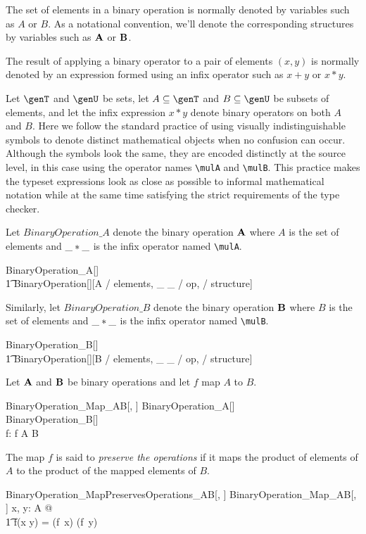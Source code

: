 \documentclass{amsart}
\begin{document}
The set of elements in a binary operation is normally denoted by variables such as $A$ or $B$.
As a notational convention, we'll denote the corresponding structures by variables such as $\mathbf{A}$ or $\mathbf{B}$.

The result of applying a binary operator to a pair of elements $(x, y)$ 
is normally denoted by an expression formed using an infix operator such as $x + y$ or $x * y$.

Let $\genT$ and $\genU$ be sets, 
let $A \subseteq \genT$ and $B \subseteq \genU$ be subsets of elements,
and let the infix expression $x * y$ denote binary operators on both $A$ and $B$.
Here we follow the standard practice of using visually indistinguishable symbols to denote distinct mathematical
objects when no confusion can occur.
Although the symbols look the same, they are encoded distinctly at the source level,
in this case using the operator names \verb|\mulA| and \verb|\mulB|.
This practice makes the typeset expressions look as close as possible to informal mathematical notation
while at the same time satisfying the strict requirements of the type checker.

Let $BinaryOperation\_A$ denote the binary operation $\mathbf{A}$ where $A$ is the set of elements and 
$\_  \mathbin{*} \_$ is the infix operator named \verb|\mulA|.
\begin{zed}
	BinaryOperation\_A[\genT]  \\
	\t1	BinaryOperation[\genT][A / elements, \_ \mulA \_ / op, \strucA / structure]
\end{zed}

Similarly, let $BinaryOperation\_B$ denote the binary operation $\mathbf{B}$ where $B$ is the set of elements and 
$\_ \mathbin{*} \_$ is the infix operator named \verb|\mulB|.
\begin{zed}
	BinaryOperation\_B[\genT]  \\
	\t1	BinaryOperation[\genT][B / elements, \_ \mulB \_ / op, \strucB / structure]
\end{zed}

Let $\mathbf{A}$ and $\mathbf{B}$ be binary operations and let $f$ map $A$ to $B$.
\begin{schema}{BinaryOperation\_Map\_AB}[\genT, \genU]
	BinaryOperation\_A[\genT] \\
	BinaryOperation\_B[\genU] \\
	f: \genT \pfun \genU
\where
	f \in A \fun B
\end{schema}

The map $f$ is said to {\em preserve the operations} if it maps the product of elements of $A$ to 
the product of the mapped elements of $B$.
\begin{schema}{BinaryOperation\_MapPreservesOperations\_AB}[\genT, \genU]
	BinaryOperation\_Map\_AB[\genT, \genU]
\where
	\forall x, y: A @ \\
	\t1	f(x \mulA y) = (f~x) \mulB (f~y)
\end{schema}
\end{document}
